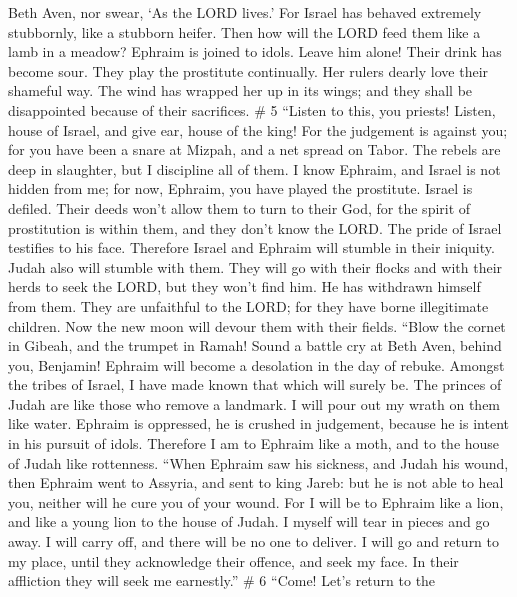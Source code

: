 Beth Aven, nor swear, `As the LORD lives.'  For Israel has
behaved extremely stubbornly, like a stubborn heifer. Then how will the
LORD feed them like a lamb in a meadow?  Ephraim is joined
to idols. Leave him alone!  Their drink has become sour.
They play the prostitute continually. Her rulers dearly love their
shameful way.  The wind has wrapped her up in its wings;
and they shall be disappointed because of their sacrifices. \# 5
 ``Listen to this, you priests! Listen, house of Israel, and
give ear, house of the king! For the judgement is against you; for you
have been a snare at Mizpah, and a net spread on Tabor.  The
rebels are deep in slaughter, but I discipline all of them. 
I know Ephraim, and Israel is not hidden from me; for now, Ephraim, you
have played the prostitute. Israel is defiled.  Their deeds
won't allow them to turn to their God, for the spirit of prostitution is
within them, and they don't know the LORD.  The pride of
Israel testifies to his face. Therefore Israel and Ephraim will stumble
in their iniquity. Judah also will stumble with them.  They
will go with their flocks and with their herds to seek the LORD, but
they won't find him. He has withdrawn himself from them. 
They are unfaithful to the LORD; for they have borne illegitimate
children. Now the new moon will devour them with their fields.
 ``Blow the cornet in Gibeah, and the trumpet in Ramah!
Sound a battle cry at Beth Aven, behind you, Benjamin! 
Ephraim will become a desolation in the day of rebuke. Amongst the
tribes of Israel, I have made known that which will surely be.
 The princes of Judah are like those who remove a landmark.
I will pour out my wrath on them like water.  Ephraim is
oppressed, he is crushed in judgement, because he is intent in his
pursuit of idols.  Therefore I am to Ephraim like a moth,
and to the house of Judah like rottenness.  ``When Ephraim
saw his sickness, and Judah his wound, then Ephraim went to Assyria, and
sent to king Jareb: but he is not able to heal you, neither will he cure
you of your wound.  For I will be to Ephraim like a lion,
and like a young lion to the house of Judah. I myself will tear in
pieces and go away. I will carry off, and there will be no one to
deliver.  I will go and return to my place, until they
acknowledge their offence, and seek my face. In their affliction they
will seek me earnestly.'' \# 6  ``Come! Let's return to the
